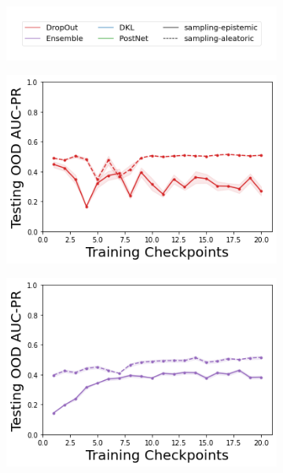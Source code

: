 \begin{figure}
    \centering
        \vspace{-3mm}
    \begin{subfigure}{.45\textwidth}
        \includegraphics[width=\textwidth]{sections/011_icml2022/resources/sampling-legend.png}
    \end{subfigure}
    \vspace{-3mm}
    
    \begin{subfigure}{.245\textwidth}
        \includegraphics[width=\textwidth]{sections/011_icml2022/resources/DropOut-AcrobotOOD-v0-AUC-PR-out-epistemic_-testing-strategy.png}
    \end{subfigure}
    \begin{subfigure}{.245\textwidth}
        \includegraphics[width=\textwidth]{sections/011_icml2022/resources/Ensemble-AcrobotOOD-v0-AUC-PR-out-epistemic_-testing-strategy.png}

\end{subfigure}
\end{figure}
